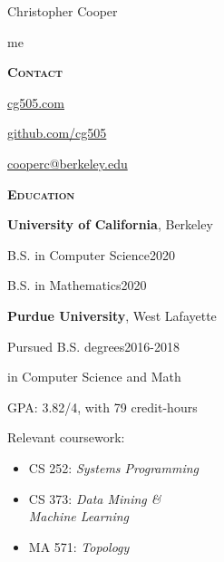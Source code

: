 \documentclass[11pt]{article}
\newcommand{\sectionfont}{\Large\scshape\bfseries\color{cg505green}}
\begin{document}
\begin{centering}
  \fontsize{40pt}{50pt}\selectfont
  \color{cg505green}
  Christopher Cooper

\end{centering}

\vspace{10pt}

\begin{minipage}[t]{0.3\textwidth}
  {\Huge\color{black} me \phantom{my work}}

  \vspace{5pt}

  {\sectionfont Contact}
  \begin{adjustwidth}{10pt}{}
    \href{https://cg505.com/}{cg505.com}

    \href{https://github.com/cg505/}{github.com/cg505}

    \href{mailto:cooperc@berkeley.edu}{cooperc@berkeley.edu}
  \end{adjustwidth}

  \vspace{5pt}

  {\sectionfont Education}

  \textbf{University of California}, Berkeley
  \begin{adjustwidth}{10pt}{}
    B.S. in Computer Science\hfill2020

    B.S. in Mathematics\hfill2020
  \end{adjustwidth}

  \textbf{Purdue University}, West Lafayette
  \begin{adjustwidth}{10pt}{}
    Pursued B.S. degrees\hfill2016-2018

    \enskip in Computer Science and Math

    GPA: 3.82/4, with 79 credit-hours

    Relevant coursework:
    \begin{itemize}[leftmargin=*]
    \item CS 252: \emph{Systems Programming}
    \item CS 373: \emph{Data Mining \&}\\\phantom{CS 373:} \emph{Machine Learning}
    \item MA 571: \emph{Topology}
    \end{itemize}
  \end{adjustwidth}

  \vspace{5pt}


\end{minipage}
\end{document}
